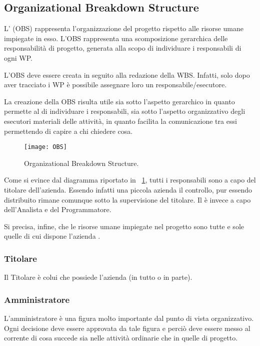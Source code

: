 \subsection{Organizational Breakdown Structure}
L' (OBS) rappresenta l'organizzazione del progetto rispetto alle risorse umane impiegate in esso.
L'OBS rappresenta una scomposizione gerarchica delle responsabilità di progetto, generata alla scopo di individuare i responsabili di ogni WP.

L'OBS deve essere creata in seguito alla redazione della WBS\@. Infatti, solo dopo aver tracciato i WP è possibile assegnare loro un responsabile/esecutore.

La creazione della OBS risulta utile sia sotto l'aspetto gerarchico in quanto permette al  di individuare i responsabili, sia sotto l'aspetto organizzativo degli esecutori materiali delle attività, in quanto facilita la comunicazione tra essi permettendo di capire a chi chiedere cosa. 

\begin{figure}[h!]
  \texttt{[image: OBS]}
	\caption{Organizational Breakdown Structure.}
	\label{fig:obs}
\end{figure}

Come si evince dal diagramma riportato in \figurename~\ref{fig:obs}, tutti i responsabili sono a capo del titolare dell'azienda. Essendo infatti una piccola azienda il controllo, pur essendo distribuito rimane comunque sotto la supervisione del titolare.
Il  è invece a capo dell'Analista e del Programmatore. 
 
Si precisa, infine, che le risorse umane impiegate nel progetto sono tutte e sole quelle di cui dispone l'azienda \team.

\subsubsection{Titolare}
Il Titolare è colui che possiede l'azienda (in tutto o in parte).
	
\subsubsection{Amministratore}		
L'amministratore è una figura molto importante dal punto di vista organizzativo. Ogni decisione deve essere approvata da 	tale figura e perciò deve essere messo al corrente di cosa succede sia nelle attività ordinarie che in quelle di progetto.
	
